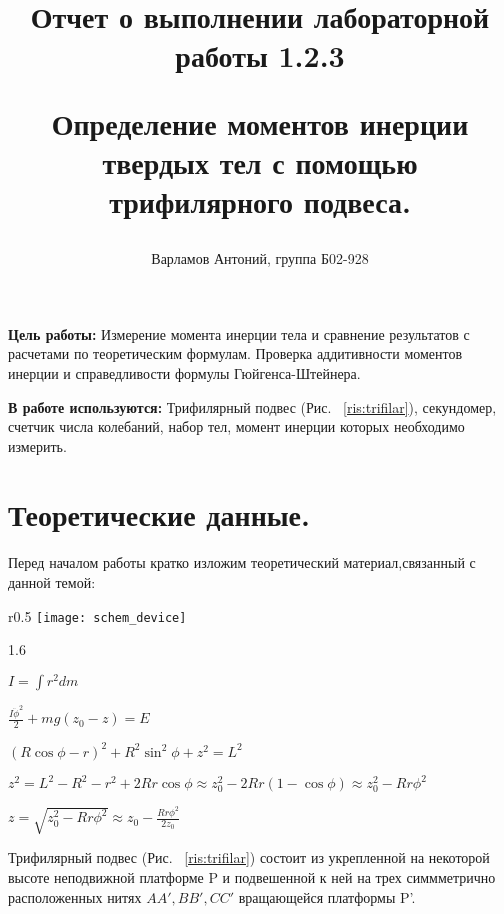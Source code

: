\documentclass[12pt,a4paper]{article}
\begin{document}
\title{
Отчет о выполнении лабораторной работы 1.2.3

Определение моментов инерции твердых тел с помощью трифилярного подвеса.
\author{Варламов Антоний, группа Б02-928}
}

\maketitle

\newpage

\textbf{Цель работы:} Измерение момента инерции тела и сравнение результатов с расчетами по теоретическим формулам. Проверка аддитивности моментов инерции и справедливости формулы Гюйгенса-Штейнера.

		
\textbf{В работе используются:} Трифилярный подвес (Рис. ~\ref{ris:trifilar}), секундомер, счетчик числа колебаний, набор тел, момент инерции которых необходимо измерить.

\section{Теоретические данные.}
	
	Перед началом работы кратко изложим теоретический материал,связанный с данной темой:
	\begin{wrapfigure}[10]{r}{0.5\textwidth}
   		\texttt{[image: schem\_device]}%
    	\caption{Трифилярный подвес}
    	\label{ris:trifilar}
	\end{wrapfigure}
	
	
	\begin{flushleft}
		\begin{spacing}{1.6}
		
			$ I = \int r^2 dm $
		
				
			$ \frac{I\ddot{\phi}^2}{2} + mg(z_{0} - z) = E $


			$ (R\cos\phi - r)^2 + R^2\sin^2\phi + z^2 = L^2 $

		
			$ z^2 = L^2 - R^2 - r^2 + 2Rr\cos\phi \approx z^2_{0} - 2Rr(1 - \cos\phi) \approx z^2_{0} - Rr\phi^2 $


			$ z = \sqrt{z^2_{0} - Rr\phi^2} \approx z_{0} - \frac{Rr\phi^2}{2z_{0}} $
			
		\end{spacing}
	\end{flushleft}
	
		Трифилярный подвес (Рис. ~\ref{ris:trifilar}) состоит из укрепленной на некоторой высоте 				неподвижной 	платформе P и подвешенной к ней на трех симмметрично расположенных нитях $ AA', BB', 		CC' $ вращающейся платформы P'.
	
\end{document}
